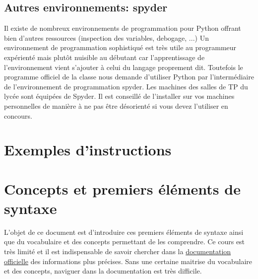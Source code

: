 \subsection{Autres environnements: spyder}
Il existe de nombreux environnements de programmation pour Python offrant bien d'autres ressources (inspection des variables, debogage, ...) Un environnement de programmation sophistiqué est très utile au programmeur expérienté mais plutôt nuisible au débutant car l'apprentissage de l'environnement vient s'ajouter à celui du langage proprement dit.\newline
Toutefois le programme officiel de la classe nous demande d'utiliser Python par l'intermédiaire de l'environnement de programmation spyder. Les machines des salles de TP du lycée sont équipées de Spyder. Il est conseillé de l'installer sur vos machines personnelles de manière à ne pas être désorienté si vous devez l'utiliser en concours. 



\section{Exemples d'instructions}



\section{Concepts et premiers éléments de syntaxe}
L'objet de ce document est d'introduire ces premiers éléments de syntaxe ainsi que du vocabulaire et des concepts permettant de les comprendre. Ce cours est très limité et il est indispensable de savoir chercher dans la \href{http://docs.python.org/3.3/reference/}{documentation officielle} des informations plus précises. Sans une certaine maitrise du vocabulaire et des concepts, naviguer dans la documentation est très difficile.
